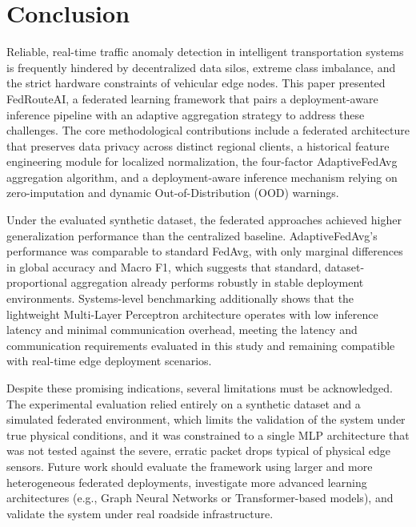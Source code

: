 \section{Conclusion}
\label{sec:conclusion}

Reliable, real-time traffic anomaly detection in intelligent transportation systems is frequently hindered by decentralized data silos, extreme class imbalance, and the strict hardware constraints of vehicular edge nodes. This paper presented FedRouteAI, a federated learning framework that pairs a deployment-aware inference pipeline with an adaptive aggregation strategy to address these challenges. The core methodological contributions include a federated architecture that preserves data privacy across distinct regional clients, a historical feature engineering module for localized normalization, the four-factor AdaptiveFedAvg aggregation algorithm, and a deployment-aware inference mechanism relying on zero-imputation and dynamic Out-of-Distribution (OOD) warnings.

Under the evaluated synthetic dataset, the federated approaches achieved higher generalization performance than the centralized baseline. AdaptiveFedAvg's performance was comparable to standard FedAvg, with only marginal differences in global accuracy and Macro F1, which suggests that standard, dataset-proportional aggregation already performs robustly in stable deployment environments. Systems-level benchmarking additionally shows that the lightweight Multi-Layer Perceptron architecture operates with low inference latency and minimal communication overhead, meeting the latency and communication requirements evaluated in this study and remaining compatible with real-time edge deployment scenarios.

Despite these promising indications, several limitations must be acknowledged. The experimental evaluation relied entirely on a synthetic dataset and a simulated federated environment, which limits the validation of the system under true physical conditions, and it was constrained to a single MLP architecture that was not tested against the severe, erratic packet drops typical of physical edge sensors. Future work should evaluate the framework using larger and more heterogeneous federated deployments, investigate more advanced learning architectures (e.g., Graph Neural Networks or Transformer-based models), and validate the system under real roadside infrastructure.
